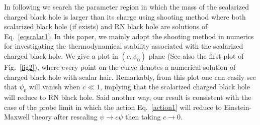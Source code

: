 \documentclass[pr, twocolumn, preprintnumbers, showpacs,footnoteadded, superscriptaddress,nofootinbib,longbibliography]{revtex4-1}
\begin{document}
In following we search the parameter region in which the mass of the scalarized charged black hole is larger than its charge using shooting method where both scalarized black hole (if exists) and RN black hole are solutions of Eq.~\eqref{eqscalar1}. In this paper, we mainly adopt the shooting method in numerics for investigating the thermodynamical stability associated with the scalarized charged black hole.
We give a plot in $(c,\psi_{0})$ plane (See also the first plot of Fig.~\ref{fig2}), where every point on the curve denotes a numerical solution of charged black hole with scalar hair. Remarkably, from this plot one can easily see that $\psi_0$ will vanish when $c \ll 1$, implying that the scalarized charged black hole will reduce to RN black hole. Said another way, our result is consistent with the case of the probe limit in which the action Eq.~\eqref{action1} will reduce to Einstein-Maxwell theory after rescaling $\psi  \to c \psi$ then taking $c \to 0$.
\end{document}
